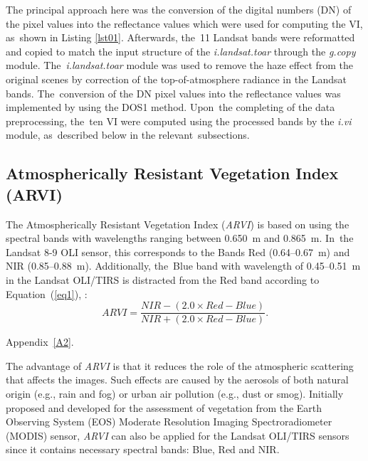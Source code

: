 \documentclass[jmse,article,accept,pdftex,moreauthors]{Definitions/mdpi}
\begin{document}
The principal approach here was the conversion of the digital numbers (DN) of the pixel values into the reflectance values which were used for computing the VI, as~shown in Listing \ref{lst01}. Afterwards, the~11 Landsat bands were reformatted and copied to match the input structure of the \emph{i.landsat.toar} through the \emph{g.copy} module. The~\emph{i.landsat.toar} module was used to remove the haze effect from the original scenes by correction of the top-of-atmosphere radiance in the Landsat bands. The~conversion of the DN pixel values into the reflectance values was implemented by using the DOS1 method. Upon~the completing of the data preprocessing, the~ten VI were computed using the processed bands by the \emph{i.vi} module, as~described below in the relevant~subsections. 

\subsection{Atmospherically Resistant Vegetation Index (ARVI)}

The Atmospherically Resistant Vegetation Index (\emph{ARVI}) is based on using the spectral bands with wavelengths ranging between 0.650~{\textmu}m and 0.865~{\textmu}m. In~the Landsat 8-9 OLI sensor, this corresponds to the Bands Red (0.64--0.67~{\textmu}m) and NIR (0.85--0.88~{\textmu}m). Additionally, the~Blue band with wavelength of 0.45--0.51~{\textmu}m in the Landsat OLI/TIRS is distracted from the Red band according to Equation~(\ref{eq1}), \cite{134076,HUETE1997440}:
\begin{equation}\label{eq1}
	ARVI = \frac{NIR - (2.0\times Red - Blue)}{NIR + (2.0\times Red - Blue)}.
\end{equation}

 Appendix~\ref{A2}. %

The advantage of \emph{ARVI} is that it reduces the role of the atmospheric scattering that affects the images. Such effects are caused by the aerosols of both natural origin (e.g., rain and fog) or urban air pollution (e.g., dust or smog). Initially proposed and developed for the assessment of vegetation from the Earth Observing System (EOS) Moderate Resolution Imaging Spectroradiometer (MODIS) sensor, \emph{ARVI} can also be applied for the Landsat OLI/TIRS sensors since it contains necessary spectral bands: Blue, Red and NIR.
\end{document}
